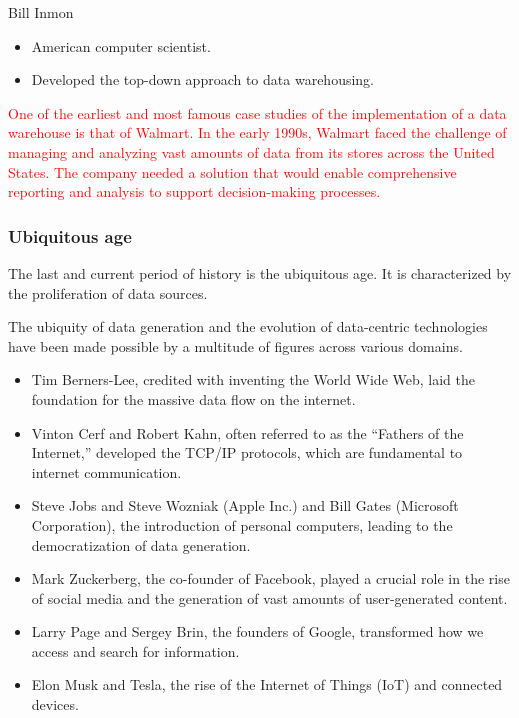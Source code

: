 \begin{mainbox}{Bill Inmon}
  \begin{itemize}
    \item American computer scientist.
    \item Developed the top-down approach to data warehousing.
  \end{itemize}
\end{mainbox}

\textcolor{red}{
One of the earliest and most famous case studies of the implementation of a data warehouse
is that of Walmart. In the early 1990s, Walmart faced the challenge of managing and
analyzing vast amounts of data from its stores across the United States. The company
needed a solution that would enable comprehensive reporting and analysis to support
decision-making processes.
}

\subsubsection{Ubiquitous age}

The last and current period of history is the ubiquitous age.  It is characterized by the
proliferation of data sources.

The ubiquity of data generation and the evolution of data-centric technologies have been
made possible by a multitude of figures across various domains.

\begin{itemize}
  \item Tim Berners-Lee, credited with inventing the World Wide Web, laid the foundation
    for the massive data flow on the internet.
  \item Vinton Cerf and Robert Kahn, often referred to as the ``Fathers of the Internet,''
    developed the TCP/IP protocols, which are fundamental to internet communication.
  \item Steve Jobs and Steve Wozniak (Apple Inc.) and Bill Gates (Microsoft Corporation),
    the introduction of personal computers, leading to the democratization of data
    generation.
  \item Mark Zuckerberg, the co-founder of Facebook, played a crucial role in the rise of
    social media and the generation of vast amounts of user-generated content.
  \item Larry Page and Sergey Brin, the founders of Google, transformed how we access and
    search for information.
  \item Elon Musk and Tesla, the rise of the Internet of Things (IoT) and connected
    devices.
\end{itemize}

